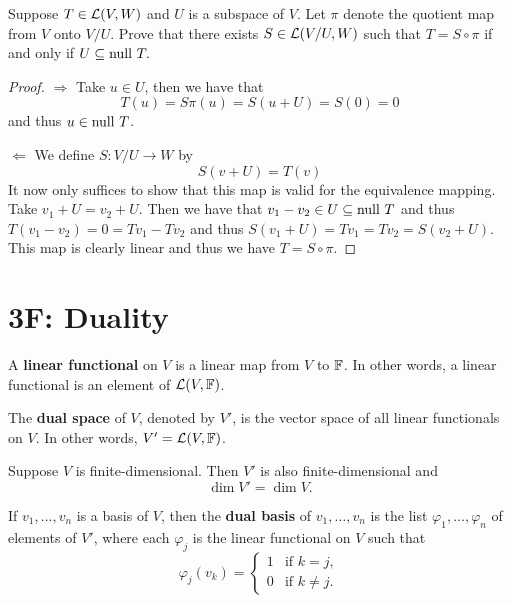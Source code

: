 \documentclass{extarticle}
\begin{document}
\begin{problem}{19}
    Suppose \(T \in \mathcal{L}(V, W)\) and \(U\) is a subspace of \(V\). Let \(\pi\) denote the quotient 
    map from \(V\) onto \(V / U\). Prove that there exists \(S \in \mathcal{L}(V/U, W)\) such that 
    \(T = S \circ \pi\) if and only if \(U \subseteq \text{null } T.\)
\end{problem}

\begin{proof}
\(\Rightarrow\) Take \(u \in U\), then we have that 
\[T(u) = S \pi(u) = S(u + U) = S(0) = 0\]
and thus \(u \in \text{null } T\). 

\(\Leftarrow\) We define \(S \colon V / U \to W\) by 
\[S(v + U) = T(v)\]
It now only suffices to show that this map is valid for the equivalence mapping. Take 
\(v_1 + U = v_2 + U\). Then we have that \(v_1 - v_2 \in U \subseteq \text{null } T\) and thus \(T(v_1 - v_2)
= 0 = T v_1 - T v_2\) and thus \(S(v_1 + U) = T v_1 = Tv_2 = S(v_2 + U)\). This map is clearly 
linear and thus we have \(T = S \circ \pi\).  
\end{proof}


\newpage 

\section*{3F: Duality}

\begin{definition}
    A \textbf{linear functional} on \(V\) is a linear map from \(V\) to \(\mathbb{F}\). In other words, 
    a linear functional is an element of \(\mathcal{L}(V, \mathbb{F})\). 
\end{definition}

\begin{definition}
    The \textbf{dual space} of \(V\), denoted by \(V'\), is the vector space of all linear 
    functionals on \(V\). In other words, \(V' = \mathcal{L}(V, \mathbb{F})\). 
\end{definition}

\begin{lemma}
    Suppose \(V\) is finite-dimensional. Then \(V'\) is also finite-dimensional and 
    \[\dim V' = \dim V.\]
\end{lemma}

\begin{definition}
    If \(v_1, \ldots, v_n\) is a basis of \(V\), then the \textbf{dual basis} of 
    \(v_1, \ldots, v_n\) is the list \(\varphi_1, \ldots, \varphi_n\) of elements 
    of \(V'\), where each \(\varphi_j\) is the linear functional on \(V\) such that 
    \[\varphi_j(v_k) = \begin{cases}
        1 &\text{if } k = j, \\ 
        0 &\text{if } k \neq j.
    \end{cases}\]
\end{definition}
\end{document}
